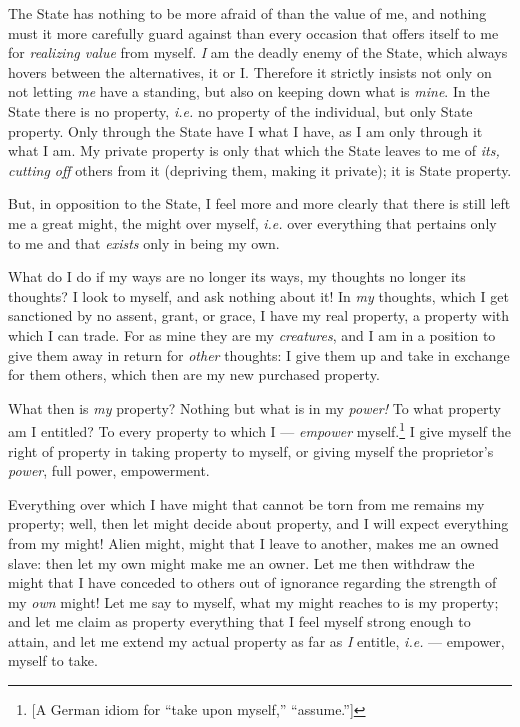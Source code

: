The State has nothing to be more afraid of than the value of me, and nothing 
must it more carefully guard against than every occasion that offers itself to 
me for \textit{realizing value} from myself. \textit{I} am the deadly enemy of 
the State, which always hovers between the alternatives, it or I. Therefore it 
strictly insists not only on not letting \textit{me} have a standing, but also 
on keeping down what is \textit{mine}. In the State there is no property, 
\textit{i.e.} no property of the individual, but only State property. Only 
through the State have I what I have, as I am only through it what I am. My 
private property is only that which the State leaves to me of \textit{its, 
cutting off} others from it (depriving them, making it private); it is State 
property.

But, in opposition to the State, I feel more and more clearly that there is 
still left me a great might, the might over myself, \textit{i.e.} over 
everything that pertains only to me and that \textit{exists} only in being my 
own.

What do I do if my ways are no longer its ways, my thoughts no longer its 
thoughts? I look to myself, and ask nothing about it! In \textit{my} thoughts, 
which I get sanctioned by no assent, grant, or grace, I have my real property, 
a property with which I can trade. For as mine they are my \textit{creatures}, 
and I am in a position to give them away in return for \textit{other} 
thoughts: I give them up and take in exchange for them others, which then are 
my new purchased property.

What then is \textit{my} property? Nothing but what is in my \textit{power!} 
To what property am I entitled? To every property to which I --- \textit{empower} myself.\footnote{[A German idiom for ``take upon myself,'' 
``assume.'']} I give myself the right of property in taking property to 
myself, or giving myself the proprietor's \textit{power}, full power, 
empowerment.

Everything over which I have might that cannot be torn from me remains my 
property; well, then let might decide about property, and I will expect 
everything from my might! Alien might, might that I leave to another, makes me 
an owned slave: then let my own might make me an owner. Let me then withdraw 
the might that I have conceded to others out of ignorance regarding the 
strength of my \textit{own} might! Let me say to myself, what my might reaches 
to is my property; and let me claim as property everything that I feel myself 
strong enough to attain, and let me extend my actual property as far as 
\textit{I} entitle, \textit{i.e.} --- empower, myself to take.

